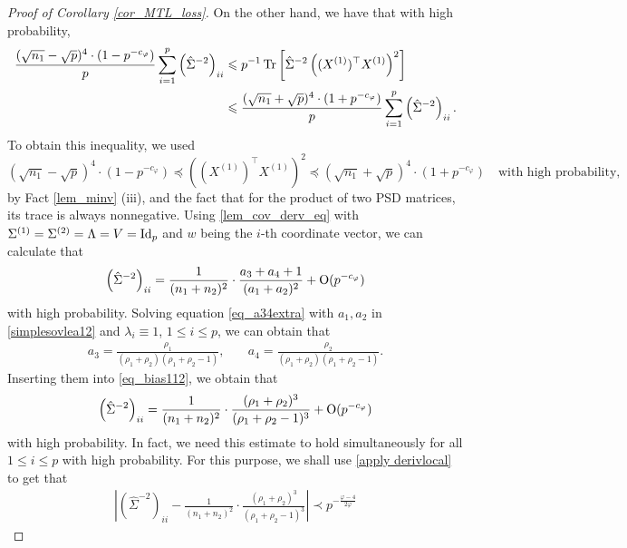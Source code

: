 \begin{proof}[Proof of Corollary \ref{cor_MTL_loss}]
On the other hand, we have that with high probability,
\begin{align}
 \frac{(\sqrt{n_1}-\sqrt{p})^4 \cdot (1- p^{-c_\varphi})}{p}\sum_{i=1}^p \left(\hat \Sigma^{-2}\right)_{ii}  &\leqslant {p}^{-1}\operatorname{Tr}\left[\hat\Sigma^{-2} \left((X^{(1)})^\top X^{(1)} \right)^2\right] \label{eq_bias111}\\ 
 &\leqslant \frac{(\sqrt{n_1}+\sqrt{p})^4 \cdot (1+ p^{-c_\varphi})}{p}\sum_{i=1}^p \left(\hat\Sigma^{-2}\right)_{ii} .\nonumber
\end{align}
To obtain this inequality, we used  
$$ (\sqrt{n_1}-\sqrt{p})^4 \cdot (1-p^{-c_\varphi}) \preceq \left((X^{(1)})^\top X^{(1)} \right)^2 \preceq (\sqrt{n_1}+\sqrt{p})^4 \cdot (1+ p^{-c_\varphi}) \quad \text{with high probability},$$
by Fact \ref{lem_minv} (iii), and the fact that for the product of two PSD matrices, its trace is always nonnegative.
Using \eqref{lem_cov_derv_eq} with $\Sigma^{(1)}=\Sigma^{(2)}=\Lambda=V=\operatorname{Id}_p$ and $w$ being the $i$-th coordinate vector, we can calculate that 
\begin{align}\label{eq_bias112}
 \left(\hat\Sigma^{-2}\right)_{ii} = \frac{1}{(n_1+n_2)^2}\cdot \frac{a_3+a_4+1}{(a_1+a_2)^2} +\operatorname{O}(p^{-c_\varphi})
\end{align}
with high probability. Solving equation \eqref{eq_a34extra} with $a_1, a_2$ in \eqref{simplesovlea12} and $\lambda_i\equiv 1$, $1\le i\le p$, we can obtain that
	\begin{align*}
		a_3 = \frac{\rho_1}{(\rho_1 + \rho_2)(\rho_1 + \rho_2 - 1)}, \quad
		&  a_4 = \frac{\rho_2}{(\rho_1 + \rho_2)(\rho_1 + \rho_2 - 1)}. %
	\end{align*}
Inserting them into \eqref{eq_bias112}, we obtain that 
\begin{align*}%
 \left(\hat\Sigma^{-2}\right)_{ii} = \frac{1}{(n_1+n_2)^2}\cdot \frac{(\rho_1+\rho_2)^3}{(\rho_1+\rho_2-1)^3} +\OO(p^{-c_\varphi})
\end{align*}
with high probability. In fact, we need this estimate to hold simultaneously for all $1\le i \le p$ with high probability. For this purpose, we shall use \eqref{apply derivlocal} to get that 
\begin{align*}%
\left| \left(\hat\Sigma^{-2}\right)_{ii} - \frac{1}{(n_1+n_2)^2}\cdot \frac{(\rho_1+\rho_2)^3}{(\rho_1+\rho_2-1)^3}\right|\prec p^{-\frac{\varphi-4}{2\varphi}}

\end{align*}
\end{proof}
